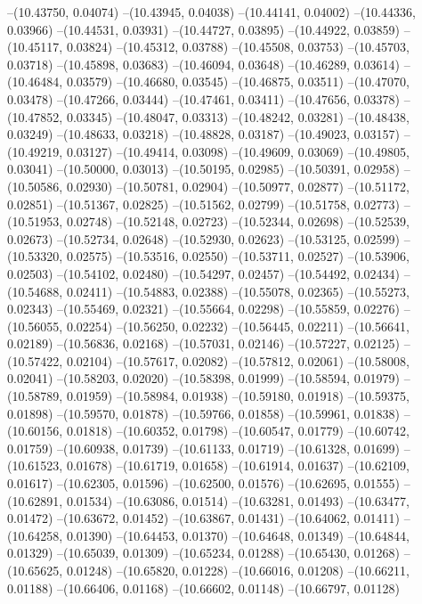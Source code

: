 --(10.43750, 0.04074)
--(10.43945, 0.04038)
--(10.44141, 0.04002)
--(10.44336, 0.03966)
--(10.44531, 0.03931)
--(10.44727, 0.03895)
--(10.44922, 0.03859)
--(10.45117, 0.03824)
--(10.45312, 0.03788)
--(10.45508, 0.03753)
--(10.45703, 0.03718)
--(10.45898, 0.03683)
--(10.46094, 0.03648)
--(10.46289, 0.03614)
--(10.46484, 0.03579)
--(10.46680, 0.03545)
--(10.46875, 0.03511)
--(10.47070, 0.03478)
--(10.47266, 0.03444)
--(10.47461, 0.03411)
--(10.47656, 0.03378)
--(10.47852, 0.03345)
--(10.48047, 0.03313)
--(10.48242, 0.03281)
--(10.48438, 0.03249)
--(10.48633, 0.03218)
--(10.48828, 0.03187)
--(10.49023, 0.03157)
--(10.49219, 0.03127)
--(10.49414, 0.03098)
--(10.49609, 0.03069)
--(10.49805, 0.03041)
--(10.50000, 0.03013)
--(10.50195, 0.02985)
--(10.50391, 0.02958)
--(10.50586, 0.02930)
--(10.50781, 0.02904)
--(10.50977, 0.02877)
--(10.51172, 0.02851)
--(10.51367, 0.02825)
--(10.51562, 0.02799)
--(10.51758, 0.02773)
--(10.51953, 0.02748)
--(10.52148, 0.02723)
--(10.52344, 0.02698)
--(10.52539, 0.02673)
--(10.52734, 0.02648)
--(10.52930, 0.02623)
--(10.53125, 0.02599)
--(10.53320, 0.02575)
--(10.53516, 0.02550)
--(10.53711, 0.02527)
--(10.53906, 0.02503)
--(10.54102, 0.02480)
--(10.54297, 0.02457)
--(10.54492, 0.02434)
--(10.54688, 0.02411)
--(10.54883, 0.02388)
--(10.55078, 0.02365)
--(10.55273, 0.02343)
--(10.55469, 0.02321)
--(10.55664, 0.02298)
--(10.55859, 0.02276)
--(10.56055, 0.02254)
--(10.56250, 0.02232)
--(10.56445, 0.02211)
--(10.56641, 0.02189)
--(10.56836, 0.02168)
--(10.57031, 0.02146)
--(10.57227, 0.02125)
--(10.57422, 0.02104)
--(10.57617, 0.02082)
--(10.57812, 0.02061)
--(10.58008, 0.02041)
--(10.58203, 0.02020)
--(10.58398, 0.01999)
--(10.58594, 0.01979)
--(10.58789, 0.01959)
--(10.58984, 0.01938)
--(10.59180, 0.01918)
--(10.59375, 0.01898)
--(10.59570, 0.01878)
--(10.59766, 0.01858)
--(10.59961, 0.01838)
--(10.60156, 0.01818)
--(10.60352, 0.01798)
--(10.60547, 0.01779)
--(10.60742, 0.01759)
--(10.60938, 0.01739)
--(10.61133, 0.01719)
--(10.61328, 0.01699)
--(10.61523, 0.01678)
--(10.61719, 0.01658)
--(10.61914, 0.01637)
--(10.62109, 0.01617)
--(10.62305, 0.01596)
--(10.62500, 0.01576)
--(10.62695, 0.01555)
--(10.62891, 0.01534)
--(10.63086, 0.01514)
--(10.63281, 0.01493)
--(10.63477, 0.01472)
--(10.63672, 0.01452)
--(10.63867, 0.01431)
--(10.64062, 0.01411)
--(10.64258, 0.01390)
--(10.64453, 0.01370)
--(10.64648, 0.01349)
--(10.64844, 0.01329)
--(10.65039, 0.01309)
--(10.65234, 0.01288)
--(10.65430, 0.01268)
--(10.65625, 0.01248)
--(10.65820, 0.01228)
--(10.66016, 0.01208)
--(10.66211, 0.01188)
--(10.66406, 0.01168)
--(10.66602, 0.01148)
--(10.66797, 0.01128)

